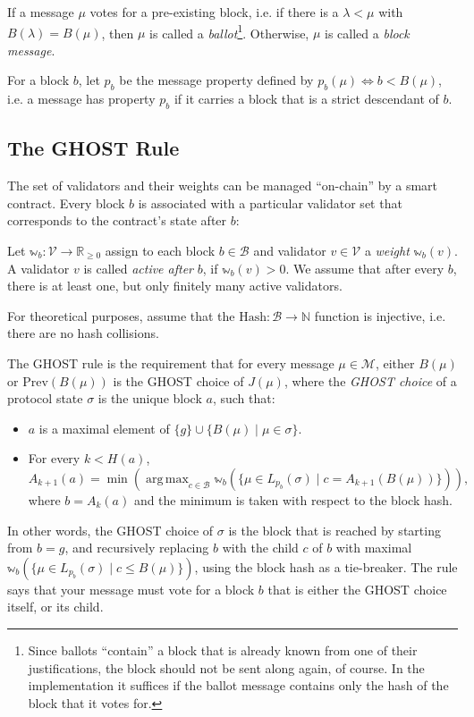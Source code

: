 \documentclass[12pt, fleqn]{article}
\newcommand{\ww}{\mathbb{w}}
\DeclareMathOperator*{\argmax}{arg\,max}
\begin{document}
If a message $\mu$ votes for a pre-existing block, i.e. if there is a $\lambda < \mu$ with $B(\lambda) = B(\mu)$, then $\mu$ is called a \emph{ballot}\footnote{Since ballots ``contain'' a block that is already known from one of their justifications, the block should not be sent along again, of course. In the implementation it suffices if the ballot message contains only the hash of the block that it votes for.}. Otherwise, $\mu$ is called a \emph{block message}.

For a block $b$, let $p_b$ be the message property defined by $p_b (\mu) \Leftrightarrow b < B(\mu)$, i.e. a message has property $p_b$ if it carries a block that is a strict descendant of $b$.


\subsection{The GHOST Rule}

The set of validators and their weights can be managed ``on-chain'' by a smart contract. Every block $b$ is associated with a particular validator set that corresponds to the contract's state after $b$:

Let $\ww_b : \mathcal{V} \rightarrow \mathbb{R}_{\geq 0}$ assign to each block $b \in \mathcal{B}$ and validator $v \in \mathcal{V}$ a \emph{weight} $\ww_b(v)$. A validator $v$ is called \emph{active after} $b$, if $\ww_b(v) > 0$. We assume that after every $b$, there is at least one, but only finitely many active validators.

For theoretical purposes, assume that the $\mathrm{Hash} : \mathcal{B} \rightarrow \mathbb{N}$ function is injective, i.e. there are no hash collisions.

The GHOST rule is the requirement that for every message $\mu \in \mathcal{M}$, either $B(\mu)$ or $\mathrm{Prev}(B(\mu))$ is the GHOST choice of $J(\mu)$, where the \emph{GHOST choice} of a protocol state $\sigma$ is the unique block $a$, such that:
\begin{itemize}
    \item $a$ is a maximal element of $\{g\} \cup \{ B(\mu) \mid \mu \in \sigma\}$.
    \item For every $k < H(a)$,
      $$A_{k + 1}(a) = \min \left(\argmax_{c\in\mathcal{B}} \ww_b(\{\mu \in L_{p_b} (\sigma) \mid c = A_{k + 1}(B(\mu))\})\right)\textrm{,}$$
      where $b = A_k(a)$ and the minimum is taken with respect to the block hash.
\end{itemize}
In other words, the GHOST choice of $\sigma$ is the block that is reached by starting from $b = g$, and recursively replacing $b$ with the child $c$ of $b$ with maximal $\ww_{b} (\{\mu \in L_{p_b}(\sigma) \mid c \leq B(\mu) \})$, using the block hash as a tie-breaker. The rule says that your message must vote for a block $b$ that is either the GHOST choice itself, or its child.
\end{document}
